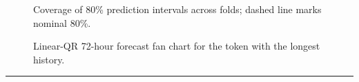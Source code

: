\documentclass[
  a4paper,
  DIV=11,
  numbers=noendperiod]{scrreprt}
\begin{document}
\begin{figure}


\caption{\label{fig-lqr-coverage-80pi-hist}Coverage of 80\% prediction
intervals across folds; dashed line marks nominal 80\%.}

\end{figure}%

\begin{figure}


\caption{\label{fig-lqr-fan-longest}Linear-QR 72-hour forecast fan chart
for the token with the longest history.}

\end{figure}%

\begin{center}\rule{0.5\linewidth}{0.5pt}\end{center}
\end{document}
